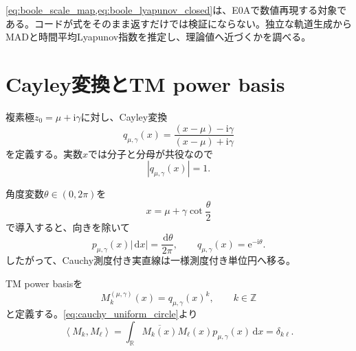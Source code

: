 \documentclass[a4paper,11pt,oneside,openany]{ltjsbook}
\newcommand{\R}{\mathbb{R}}
\newcommand{\dd}{\,\mathrm{d}}
\newcommand{\e}{\mathrm{e}}
\newcommand{\ii}{\mathrm{i}}
\begin{document}
\begin{auditbox}
\cref{eq:boole_scale_map,eq:boole_lyapunov_closed}は、E0Aで数値再現する対象である。コードが式をそのまま返すだけでは検証にならない。独立な軌道生成からMADと時間平均Lyapunov指数を推定し、理論値へ近づくかを調べる。
\end{auditbox}

\section{Cayley変換とTM power basis}

複素極\(z_0=\mu+\ii\gamma\)に対し、Cayley変換
\begin{equation}
  q_{\mu,\gamma}(x)
  = \frac{(x-\mu)-\ii\gamma}{(x-\mu)+\ii\gamma}
  \label{eq:cayley}
\end{equation}
を定義する。実数\(x\)では分子と分母が共役なので
\begin{equation}
  |q_{\mu,\gamma}(x)|=1.
  \label{eq:cayley_modulus}
\end{equation}

角度変数\(\theta\in(0,2\pi)\)を
\begin{equation}
  x=\mu+\gamma\cot\frac{\theta}{2}
  \label{eq:cauchy_angle}
\end{equation}
で導入すると、向きを除いて
\begin{equation}
  p_{\mu,\gamma}(x)|\dd x|
  =\frac{\dd\theta}{2\pi},
  \qquad
  q_{\mu,\gamma}(x)=\e^{-\ii\theta}.
  \label{eq:cauchy_uniform_circle}
\end{equation}
したがって、Cauchy測度付き実直線は一様測度付き単位円へ移る。

TM power basisを
\begin{equation}
  M_k^{(\mu,\gamma)}(x)
  =q_{\mu,\gamma}(x)^k,
  \qquad k\in\mathbb Z
  \label{eq:tm_power_basis}
\end{equation}
と定義する。\cref{eq:cauchy_uniform_circle}より
\begin{equation}
  \left\langle M_k,M_{\ell}\right\rangle
  =\int_{\R}\overline{M_k(x)}M_{\ell}(x)
    p_{\mu,\gamma}(x)\dd x
  =\delta_{k\ell}.
  \label{eq:tm_orthonormal}
\end{equation}
\end{document}
